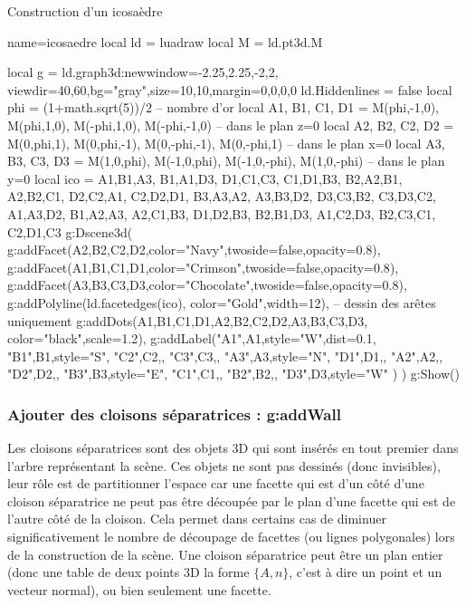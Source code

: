 \begin{demo}{Construction d'un icosaèdre}
\begin{luadraw}{name=icosaedre}
local ld = luadraw
local M = ld.pt3d.M

local g = ld.graph3d:new{window={-2.25,2.25,-2,2}, viewdir={40,60},bg="gray",size={10,10},margin={0,0,0,0}}
ld.Hiddenlines = false
local phi = (1+math.sqrt(5))/2 -- nombre d'or
local A1, B1, C1, D1 = M(phi,-1,0), M(phi,1,0), M(-phi,1,0), M(-phi,-1,0) -- dans le plan z=0
local A2, B2, C2, D2 = M(0,phi,1), M(0,phi,-1), M(0,-phi,-1), M(0,-phi,1) -- dans le plan x=0
local A3, B3, C3, D3 = M(1,0,phi), M(-1,0,phi), M(-1,0,-phi), M(1,0,-phi) -- dans le plan y=0
local ico = {
{A1,B1,A3}, {B1,A1,D3}, {D1,C1,C3}, {C1,D1,B3},
{B2,A2,B1}, {A2,B2,C1}, {D2,C2,A1}, {C2,D2,D1},
{B3,A3,A2}, {A3,B3,D2}, {D3,C3,B2}, {C3,D3,C2},
{A1,A3,D2}, {B1,A2,A3}, {A2,C1,B3}, {D1,D2,B3},
{B2,B1,D3}, {A1,C2,D3}, {B2,C3,C1}, {C2,D1,C3} }
g:Dscene3d(
    g:addFacet({A2,B2,C2,D2},{color="Navy",twoside=false,opacity=0.8}),
    g:addFacet({A1,B1,C1,D1},{color="Crimson",twoside=false,opacity=0.8}),
    g:addFacet({A3,B3,C3,D3},{color="Chocolate",twoside=false,opacity=0.8}),
    g:addPolyline(ld.facetedges(ico), {color="Gold",width=12}), -- dessin des arêtes uniquement
    g:addDots({A1,B1,C1,D1,A2,B2,C2,D2,A3,B3,C3,D3}, {color="black",scale=1.2}),
    g:addLabel("A1",A1,{style="W",dist=0.1}, "B1",B1,{style="S"}, "C2",C2,{}, "C3",C3,{},
        "A3",A3,{style="N"}, "D1",D1,{}, "A2",A2,{}, "D2",D2,{}, "B3",B3,{style="E"},
        "C1",C1,{}, "B2",B2,{}, "D3",D3,{style="W"} )
)
g:Show()
\end{luadraw}
\end{demo}

\subsubsection{Ajouter des cloisons séparatrices : g:addWall}

Les cloisons séparatrices sont des objets 3D qui sont insérés en tout premier dans l'arbre représentant la scène. Ces objets ne sont pas dessinés (donc invisibles), leur rôle est de partitionner l'espace car une facette qui est d'un côté d'une cloison séparatrice ne peut pas être découpée par le plan d'une facette qui est de l'autre côté de la cloison. Cela permet dans certains cas de diminuer significativement le nombre de découpage de facettes (ou lignes polygonales) lors de la construction de la scène. Une cloison séparatrice peut être un plan entier (donc une table de deux points 3D la forme $\{A,n\}$, c'est à dire un point et un vecteur normal), ou bien seulement une facette.

